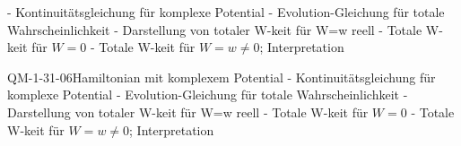 - Kontinuitätsgleichung für komplexe Potential
- Evolution-Gleichung für totale Wahrscheinlichkeit
- Darstellung von totaler W-keit für W=w reell
- Totale W-keit für $W=0$
- Totale W-keit für $W=w\neq 0$; Interpretation

\begin{REM}{QM-1-31-06}{Hamiltonian mit komplexem Potential
- Kontinuitätsgleichung für komplexe Potential
- Evolution-Gleichung für totale Wahrscheinlichkeit
- Darstellung von totaler W-keit für W=w reell
- Totale W-keit für $W=0$
- Totale W-keit für $W=w\neq 0$; Interpretation}
\end{REM}

